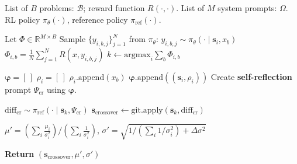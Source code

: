 \documentclass{article}
\theoremstyle{plain}
\theoremstyle{definition}
\theoremstyle{remark}
\begin{document}
\begin{algorithm}[H]
\caption{$\mathrm{Crossover}(\mathcal{B}, R, \Omega, \pi_{\theta}, \pi_{\text{ref}} )$}
    \label{alg:crossover}
    \begin{algorithmic}
         List of $B$ problems: $\mathcal{B}$; reward function $R(\cdot, \cdot)$.
         List of $M$ system prompts: $\Omega$.
         RL policy $\pi_{\theta}(\cdot)$, reference policy $\pi_{\text{ref}}(\cdot)$.
        \vspace{5pt}

        \STATE Let $\Phi \in \mathbb{R}^{M \times B}$ \hfill {}
                \STATE Sample $\{y_{i, b, j}\}_{j=1}^{N}$ from $\pi_{\theta}$: $y_{i, b, j}\sim \pi_{\theta}(\cdot \mid \mathbf{s}_{i}, x_{b})$ \hfill {}
                \STATE $\Phi_{i, b} = \frac{1}{N} {\sum}_{j=1}^{N} R(x, y_{i, b, j})$
            \ENDFOR
        \ENDFOR
        \STATE $k\leftarrow \mathrm{argmax}_{i} {\sum}_{b} \Phi_{i,b}$ \hfill {}
        \vspace{5pt}

        \STATE $\boldsymbol{\varphi} = [\,]$ \hfill {}
            \STATE $\rho_{i}=[\,]$
                    \STATE $\rho_{i}$.$\mathrm{append}(x_{b})$ \hfill {}
                \ENDIF
            \ENDFOR
            \STATE $\boldsymbol{\varphi}.\mathrm{append}((\mathbf{s}_{i}, \rho_{i}))$ \hfill {}
        \ENDFOR
        \STATE Create {\color{magenta}\textbf{{} self-reflection}} prompt $\Psi_{\text{cr}}$ using $\boldsymbol{\varphi}$.
        \vspace{5pt}

        \STATE $\mathrm{diff}_{\text{cr}} \sim \pi_{\text{ref}}(\cdot \mid \mathbf{s}_{k}, \Psi_{\text{cr}})$
        \STATE $\mathbf{s}_{\text{crossover}} \leftarrow \mathrm{git}.\mathrm{apply}(\mathbf{s}_{k}, \mathrm{diff}_{\text{cr}})$ \hfill  {}
        \vspace{5pt}

        \STATE $\mu' = ({\sum}_{i}\frac{\mu_{i}}{\sigma_{i}^{2}})/({\sum}_{i}\frac{1}{\sigma_{i}^{2}})$, $\sigma' = \sqrt{{{1}/({{\sum}_{i}{{1}/{\sigma_{i}^{2}}}}) + \Delta \sigma^{2}}}$

        \STATE \textbf{Return} $(\mathbf{s}_{\text{crossover}}, \mu', \sigma')$
    \end{algorithmic}
\end{algorithm}
\end{document}

